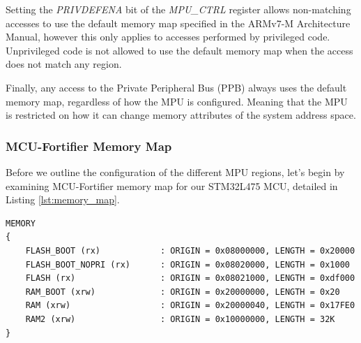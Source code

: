 \documentclass{article}
\begin{document}
Setting the \textit{PRIVDEFENA} bit of the \textit{MPU\_CTRL} register allows non-matching accesses to use the default memory map specified in the ARMv7-M Architecture Manual\cite{armv7m}, however this only applies to accesses performed by privileged code. Unprivileged code is not allowed to use the default memory map when the access does not match any region.

Finally, any access to the Private Peripheral Bus (PPB) always uses the default memory map, regardless of how the MPU is configured. Meaning that the MPU is restricted on how it can change memory attributes of the system address space.

\subsubsection{MCU-Fortifier Memory Map}
\label{subsubsec:memory_map}
Before we outline the configuration of the different MPU regions, let's begin by examining MCU-Fortifier memory map for our STM32L475 MCU, detailed in Listing \ref{lst:memory_map}.

\begin{lstlisting}[caption={MCU-Fortifier memory map linker script (memory\_map.ld)},captionpos=b,label=lst:memory_map]
MEMORY
{
	FLASH_BOOT (rx)            : ORIGIN = 0x08000000, LENGTH = 0x20000
	FLASH_BOOT_NOPRI (rx)      : ORIGIN = 0x08020000, LENGTH = 0x1000
	FLASH (rx)                 : ORIGIN = 0x08021000, LENGTH = 0xdf000
	RAM_BOOT (xrw)             : ORIGIN = 0x20000000, LENGTH = 0x20
	RAM (xrw)                  : ORIGIN = 0x20000040, LENGTH = 0x17FE0
	RAM2 (xrw)                 : ORIGIN = 0x10000000, LENGTH = 32K
}
\end{lstlisting}
\end{document}

